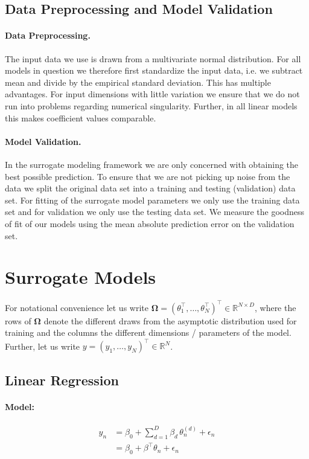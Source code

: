 \documentclass[a4paper, 12pt]{article}
\begin{document}
\subsection{Data Preprocessing and Model Validation}

\paragraph{Data Preprocessing.}

The input data we use is drawn from a multivariate normal distribution.
For all models in question we therefore first standardize the input data, i.e. we subtract mean and divide by the empirical standard deviation.
This has multiple advantages.
For input dimensions with little variation we ensure that we do not run into problems regarding numerical singularity.
Further, in all linear models this makes coefficient values comparable.

\paragraph{Model Validation.}

In the surrogate modeling framework we are only concerned with obtaining the best possible prediction.
To ensure that we are not picking up noise from the data we split the original data set into a training and testing (validation) data set.
For fitting of the surrogate model parameters we only use the training data set and for validation we only use the testing data set.
We measure the goodness of fit of our models using the mean absolute prediction error on the validation set.


\section{Surrogate Models}

For notational convenience let us write $\bm{\Omega} = (\theta_1^\top, \dots, \theta_N^\top)^\top \in \mathbb{R}^{N \times D}$, where the rows of $\bm{\Omega}$ denote the different draws from the asymptotic distribution used for training and the columns the different dimensions / parameters of the model.
Further, let us write $y = (y_1, \dots, y_N)^\top \in \mathbb{R}^N$.

\subsection{Linear Regression}

\paragraph{Model:}
\begin{align}\label{eq:linear_model}
  y_n &= \beta_0 + \sum_{d = 1}^D \beta_d \, \theta_n^{(d)} + \epsilon_n\\
      &= \beta_0 + \beta^\top \theta_n + \epsilon_n
\end{align}
\end{document}
